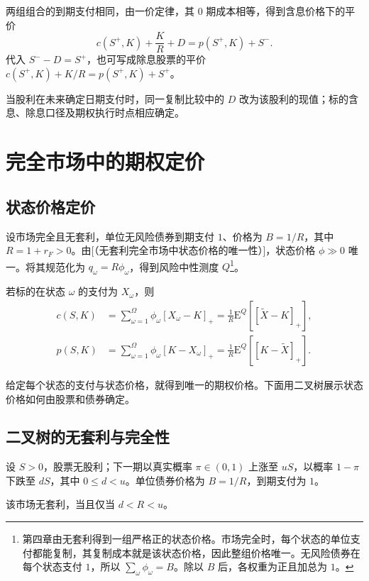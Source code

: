 两组组合的到期支付相同，由一价定律，其 0 期成本相等，得到含息价格下的平价
\[
 c(S^+,K)+\frac K R+D=p(S^+,K)+S^-.
\]
代入 $S^--D=S^+$，也可写成除息股票的平价 $c(S^+,K)+K/R=p(S^+,K)+S^+$。

当股利在未来确定日期支付时，同一复制比较中的 $D$ 改为该股利的现值；标的含息、除息口径及期权执行时点相应确定。

\section{完全市场中的期权定价}\label{sec:wj-five-complete}
\subsection{状态价格定价}
设市场完全且无套利，单位无风险债券到期支付 $1$、价格为 $B=1/R$，其中 $R=1+r_F>0$。由[（无套利完全市场中状态价格的唯一性）]，状态价格 $\phi\gg0$ 唯一。将其规范化为 $q_\omega=R\phi_\omega$，得到风险中性测度 $Q$\footnote{第四章由无套利得到一组严格正的状态价格。市场完全时，每个状态的单位支付都能复制，其复制成本就是该状态价格，因此整组价格唯一。无风险债券在每个状态支付 $1$，所以 $\sum_\omega\phi_\omega=B$。除以 $B$ 后，各权重为正且加总为 $1$。}。

\begin{tcolorbox}[knowledge,title=完全市场中的期权定价]
若标的在状态 $\omega$ 的支付为 $X_\omega$，则
\[
 \begin{aligned}
 c(S,K)&=\sum_{\omega=1}^{\Omega}\phi_\omega[X_\omega-K]_+
       =\frac1R\mathrm E^Q[[\tilde X-K]_+],\\
 p(S,K)&=\sum_{\omega=1}^{\Omega}\phi_\omega[K-X_\omega]_+
       =\frac1R\mathrm E^Q[[K-\tilde X]_+].
 \end{aligned}
\]
\end{tcolorbox}
给定每个状态的支付与状态价格，就得到唯一的期权价格。下面用二叉树展示状态价格如何由股票和债券确定。

\subsection{二叉树的无套利与完全性}\label{sec:wj-five-binomial}
设 $S>0$，股票无股利；下一期以真实概率 $\pi\in(0,1)$ 上涨至 $uS$，以概率 $1-\pi$ 下跌至 $dS$，其中 $0\le d<u$。单位债券价格为 $B=1/R$，到期支付为 $1$。
\begin{center}
\qquad
{}
\end{center}
\begin{tcolorbox}[knowledge,title=二叉树的无套利条件]
该市场无套利，当且仅当 $d<R<u$。
\end{tcolorbox}

